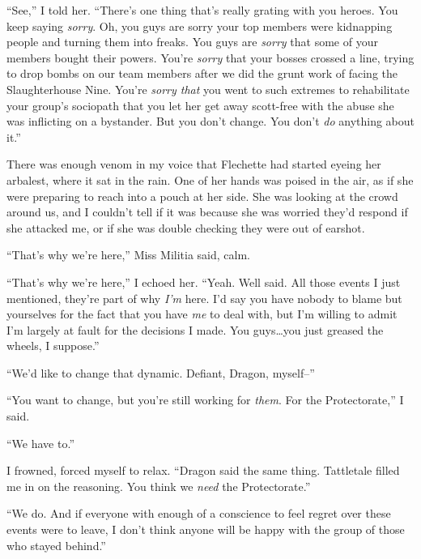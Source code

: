 ``See,'' I told her. ``There's one thing that's really grating with you heroes.  You keep saying \emph{sorry}.  Oh, you guys are sorry your top members were kidnapping people and turning them into freaks.  You guys are \emph{sorry} that some of your members bought their powers.  You're \emph{sorry} that your bosses crossed a line, trying to drop bombs on our team members after we did the grunt work of facing the Slaughterhouse Nine.  You're \emph{sorry that }you went to such extremes to rehabilitate your group's sociopath that you let her get away scott-free with the abuse she was inflicting on a bystander.  But you don't change.  You don't \emph{do} anything about it.''



There was enough venom in my voice that Flechette had started eyeing her arbalest, where it sat in the rain.  One of her hands was poised in the air, as if she were preparing to reach into a pouch at her side.  She was looking at the crowd around us, and I couldn't tell if it was because she was worried they'd respond if she attacked me, or if she was double checking they were out of earshot.



``That's why we're here,'' Miss Militia said, calm.



``That's why we're here,'' I echoed her.  ``Yeah.  Well said.  All those events I just mentioned, they're part of why \emph{I'm} here.  I'd say you have nobody to blame but yourselves for the fact that you have \emph{me} to deal with, but I'm willing to admit I'm largely at fault for the decisions I made.  You guys\ldots you just greased the wheels, I suppose.''



``We'd like to change that dynamic.  Defiant, Dragon, myself--''



``You want to change, but you're still working for \emph{them}.  For the Protectorate,'' I said.



``We have to.''



I frowned, forced myself to relax.  ``Dragon said the same thing.  Tattletale filled me in on the reasoning.  You think we \emph{need} the Protectorate.''



``We do.  And if everyone with enough of a conscience to feel regret over these events were to leave, I don't think anyone will be happy with the group of those who stayed behind.''



